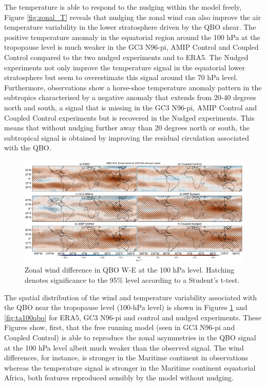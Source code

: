 The temperature is able to respond to the nudging within the model freely, Figure \ref{fig:zonal_T} reveals that nudging the zonal wind can also improve the air temperature variability in the lower stratosphere driven by the QBO shear. The positive temperature anomaly in the equatorial region around the 100 hPa at the tropopause level is much weaker in the GC3 N96-pi, AMIP Control and Coupled Control compared to the two nudged experiments and to ERA5. The Nudged experiments not only improve the temperature signal in the equatorial lower stratosphere but seem to overestimate this signal around the 70 hPa level. Furthermore, observations show a horse-shoe temperature anomaly pattern in the subtropics characterised by a negative anomaly that extends from 20-40 degrees north and south, a signal that is missing in the GC3 N96-pi, AMIP Control and Coupled Control experiments but is recovered in the Nudged experiments. This means that without nudging further away than 20 degrees north or south, the subtropical signal is obtained by improving the residual circulation associated with the QBO. 

\begin{figure}[t!]
\centering
 \includegraphics[width=\linewidth]{figures/ua100climqbowf.png}
\caption[Zonal wind QBO W-E difference 100 hPa level]{Zonal wind difference in QBO W-E at the 100 hPa level. Hatching denotes significance to the 95\% level according to a Student's t-test.}
\label{fig:ua100qbo}
\end{figure}

The spatial distribution of the wind and temperature variability associated with the QBO near the tropopause level (100-hPa level) is shown in Figures \ref{fig:ua100qbo} and \ref{fig:ta100qbo} for ERA5, GC3 N96-pi and control and nudged experiments. 
These Figures show, first, that the free running model (seen in GC3 N96-pi and Coupled Control) is able to reproduce the zonal asymmetries in the QBO signal \citep{tegtmeier2020b} at the 100 hPa level albeit much weaker than the observed signal. The wind differences, for instance, is stronger in the Maritime continent in observations whereas the temperature signal is stronger in the Maritime continent equatorial Africa, both features reproduced sensibly by the model without nudging. 

